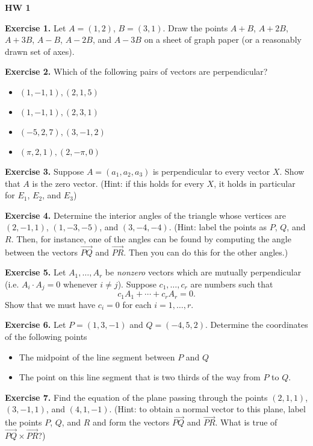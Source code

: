 \documentclass{article}
\begin{document}

\textbf{HW 1}

\textbf{Exercise 1.}
 Let $A = (1,2)$, $B = (3,1)$. Draw the points $A+B$, $A+2B$, $A+3B$, $A-B$, $A-2B$, and $A - 3B$
 on a sheet of graph paper (or a reasonably drawn set of axes).

\textbf{Exercise 2.} Which of the following pairs of vectors are perpendicular?
\begin{itemize}
    \item $(1,-1,1), (2,1,5)$ 
    \item $(1,-1,1), (2,3,1)$ 
    \item $(-5,2,7), (3,-1,2)$
    \item $(\pi,2,1), (2,-\pi,0)$
\end{itemize}

\textbf{Exercise 3.}
Suppose $A = (a_1,a_2,a_3)$ is perpendicular to every vector $X$. Show that
$A$ is the zero vector. (Hint: if this holds for every $X$, it holds in particular for $E_1$, $E_2$, and $E_3$)

\textbf{Exercise 4.}  Determine the interior angles of the triangle whose vertices are 
$(2, -1, 1)$, $(1, - 3, - 5)$, and $(3, -4, -4)$. (Hint: label the points as $P$, $Q$, and $R$.
Then, for instance, one of the angles can be found by computing the angle between
the vectors $\overrightarrow{PQ}$ and $\overrightarrow{PR}$. Then you can do this for the other angles.)

\textbf{Exercise 5.} Let $A_1, \ldots, A_r$ be \emph{nonzero} vectors which are mutually perpendicular
(i.e. $A_i \cdot A_j = 0$ whenever $i \neq j$). Suppose $c_1, \ldots, c_r$ are numbers such that
\[c_1 A_1 + \cdots + c_r A_r = 0.\]
Show that we must have $c_i = 0$ for each $i=1,\ldots, r$.

\textbf{Exercise 6.} Let $P = (1,3, -1)$ and $Q = (-4,5,2)$. 
Determine the coordinates of the following points
\begin{itemize}
    \item The midpoint of the line segment between $P$ and $Q$
    \item The point on this line segment that is two thirds of the way from $P$ to $Q$.
\end{itemize}

\textbf{Exercise 7.} Find the equation of the plane passing through the points
$(2,1,1)$, $(3,-1,1)$, and $(4,1,-1)$. (Hint: to obtain a normal vector to this plane, label
the points $P$, $Q$, and $R$ and form the vectors $\overrightarrow{PQ}$ and $\overrightarrow{PR}$. 
What is true of $\overrightarrow{PQ} \times \overrightarrow{PR}$?)
\end{document}
